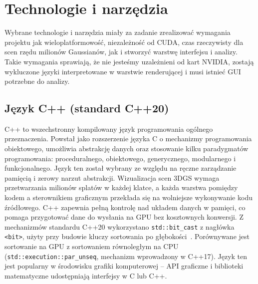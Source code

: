 \chapter{Technologie i narzędzia}
\label{chap:technologie}
Wybrane technologie i narzędzia miały za zadanie zrealizować wymagania projektu jak wieloplatformowość, niezależność od CUDA, czas rzeczywisty dla scen rzędu milionów Gaussianów, jak i stworzyć warstwę interfejsu i analizy. Takie wymagania sprawiają, że nie jesteśmy uzależnieni od kart NVIDIA, zostają wykluczone języki interpretowane w warstwie renderującej i musi istnieć GUI potrzebne do analizy.
\section{Język C++ (standard C++20)}
\label{sec:c++}
C++ to wszechstronny kompilowany język programowania ogólnego przeznaczenia. Powstał jako rozszerzenie języka C o mechanizmy programowania obiektowego, umożliwia abstrakcję danych oraz stosowanie kilku paradygmatów programowania: proceduralnego, obiektowego, generycznego, modularnego i funkcjonalnego. Język ten został wybrany ze względu na ręczne zarządzanie pamięcią i zerowy narzut abstrakcji. Wizualizacja scen 3DGS wymaga przetwarzania milionów splatów w każdej klatce, a każda warstwa pomiędzy kodem a sterownikiem graficznym przekłada się na wolniejsze wykonywanie kodu źródłowego. C++ zapewnia pełną kontrolę nad układem danych w pamięci, co pomaga przygotować dane do wysłania na GPU bez kosztownych konwersji. Z mechanizmów standardu C++20 wykorzystano \texttt{std::bit\_cast} z nagłówka \texttt{<bit>}, użyty przy budowie kluczy sortowania po głębokości~\cite{wg21_2020draft}. Porównywane jest sortowanie na GPU z sortowaniem równoległym na CPU (\texttt{std::execution::par\_unseq}, mechanizm wprowadzony w C++17). Język ten jest popularny w środowisku grafiki komputerowej -- API graficzne i biblioteki matematyczne udostępniają interfejsy w C lub C++.
